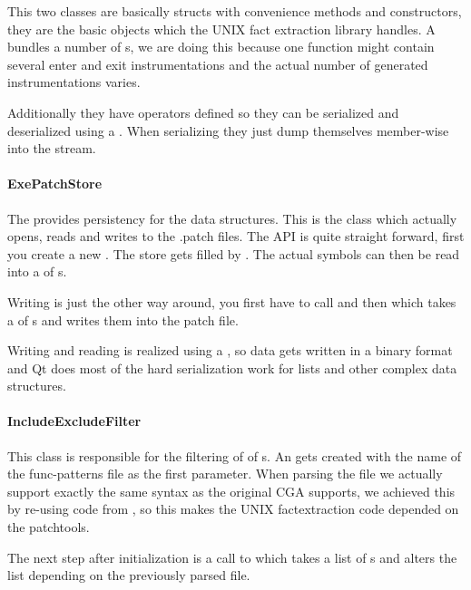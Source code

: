 This two classes are basically structs with convenience methods and constructors, they are the basic objects which the UNIX fact extraction library handles.  A  bundles a number of s, we are doing this because one function might contain several enter and exit instrumentations and the actual number of generated instrumentations varies.

Additionally they have operators defined so they can be serialized and deserialized using a .  When serializing they just dump themselves member-wise into the stream.

\paragraph{ExePatchStore}

The  provides persistency for the data structures.  This is the class which actually opens, reads and writes to the .patch files.  The API is quite straight forward, first you create a new .  The store gets filled by .  The actual symbols can then be read into a  of s.

Writing is just the other way around, you first have to call  and then  which takes a  of s and writes them into the patch file.

Writing and reading is realized using a , so data gets written in a binary format and Qt does most of the hard serialization work for lists and other complex data structures.

\paragraph{IncludeExcludeFilter}

This class is responsible for the filtering of  of s.   An  gets created with the name of the func-patterns file as the first parameter.  When parsing the file we actually support exactly the same syntax as the original CGA supports, we achieved this by re-using code from , so this makes the UNIX factextraction code depended on the patchtools.

The next step after initialization is a call to  which takes a list of s and alters the list depending on the previously parsed file.


